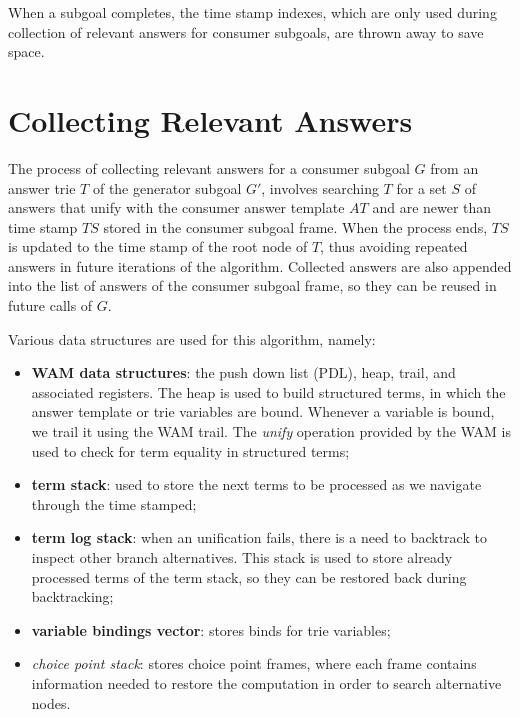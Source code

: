 When a subgoal completes, the time stamp indexes, which are only used
during collection of relevant answers
for consumer subgoals, are thrown away to save space.

\section{Collecting Relevant Answers}\label{sec:collect}

The process of collecting relevant answers for a consumer subgoal $G$ from an answer trie $T$
of the generator subgoal $G'$, involves searching $T$ for a set $S$ of answers that unify
with the consumer answer template $AT$ and are newer than time stamp
$TS$ stored in the consumer subgoal frame.
When the process ends, $TS$ is updated to the
time stamp of the root node of $T$, thus avoiding repeated answers in future iterations
of the algorithm. Collected answers are also appended into the list of answers of the consumer
subgoal frame, so they can be reused in future calls of $G$.

Various data structures are used for this algorithm, namely:

\begin{itemize}
  \item \textbf{WAM data structures}: the push down list (PDL),
  heap, trail, and associated registers. The heap is used to build structured terms, in which the
  answer template or trie variables are bound. Whenever a variable is bound, we trail it using the WAM trail. The \textit{unify} operation provided by the WAM is used to check for term equality in structured terms;
  
  \item \textbf{term stack}: used to store the next terms to be processed as we navigate through the time stamped;
  
  \item \textbf{term log stack}: when an unification fails, there is a need to backtrack to inspect other branch alternatives.
  This stack is used to store already processed terms of the term stack, so they can be restored back during backtracking;
  
  \item \textbf{variable bindings vector}: stores binds for trie variables;
  
  \item \textit{choice point stack}: stores choice point frames, where each frame contains
  information needed to restore the computation in order to search alternative nodes.
\end{itemize}

